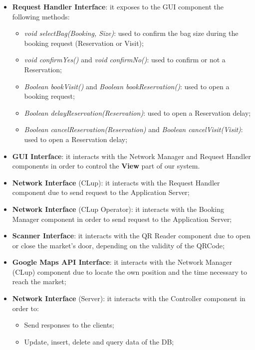 \begin{itemize}

\item \textbf{Request Handler Interface}: it exposes to the GUI component the following methods:
\begin{itemize}
\item \textit{void selectBag(Booking, Size)}: used to confirm the bag size during the booking request (Reservation or Visit);
\item \textit{void confirmYes()} and \textit{void confirmNo()}: used to confirm or not a Reservation;
\item \textit{Boolean bookVisit()} and \textit{Boolean bookReservation()}: used to open a booking request;
\item \textit{Boolean delayReservation(Reservation)}: used to open a Reservation delay;
\item \textit{Boolean cancelReservation(Reservation)} and \textit{Boolean cancelVisit(Visit)}: used to open a Reservation delay;
\end{itemize}

\item \textbf{GUI Interface}: it interacts with the Network Manager and Request Handler components in order to control the \textbf{View} part of our system. 

\item \textbf{Network Interface} (CLup): it interacts with the Request Handler component due to send request to the Application Server;

\item \textbf{Network Interface} (CLup Operator): it interacts with the Booking Manager component in order to send request to the Application Server;


\item \textbf{Scanner Interface}: it interacts with the QR Reader component due to open or close the market's door, depending on the validity of the QRCode;

\item \textbf{Google Maps API Interface}: it interacts with the Network Manager (CLup) component due to locate the own position and the time necessary to reach the market;


\item \textbf{Network Interface} (Server): it interacts with the Controller component in order to:
\begin{itemize}
\item Send responses to the clients;
\item Update, insert, delete and query data of the DB;
\end{itemize}


\end{itemize}
